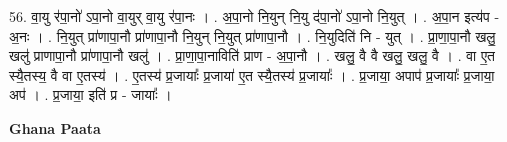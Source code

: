 \documentclass[17pt]{extarticle}
\begin{document}
56. वा॒यु र॑पा॒नो॑ ऽपा॒नो वा॒युर् वा॒यु र॑पा॒नः । . अ॒पा॒नो नि॒युन् नि॒यु द॑पा॒नो॑ ऽपा॒नो नि॒युत् । . अ॒पा॒न इत्य॑प - अ॒नः । . नि॒युत् प्रा॑णापा॒नौ प्रा॑णापा॒नौ नि॒युन् नि॒युत् प्रा॑णापा॒नौ । . नि॒युदिति॑ नि - युत् । . प्रा॒णा॒पा॒नौ खलु॒ खलु॑ प्राणापा॒नौ प्रा॑णापा॒नौ खलु॑ । . प्रा॒णा॒पा॒नाविति॑ प्राण - अ॒पा॒नौ । . खलु॒ वै वै खलु॒ खलु॒ वै । . वा ए॒त स्यै॒तस्य॒ वै वा ए॒तस्य॑ । . ए॒तस्य॑ प्र॒जायाः᳚ प्र॒जाया॑ ए॒त स्यै॒तस्य॑ प्र॒जायाः᳚ । . प्र॒जाया॒ अपाप॑ प्र॒जायाः᳚ प्र॒जाया॒ अप॑ । . प्र॒जाया॒ इति॑ प्र - जायाः᳚ । \newline

\textbf{Ghana Paata } \newline
\end{document}
